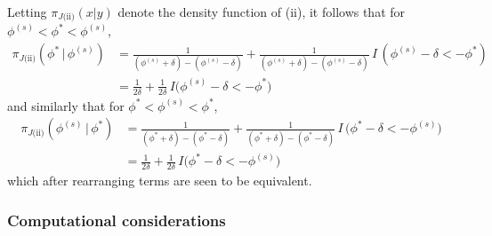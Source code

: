 \documentclass[11pt]{article}
\newcommand{\barS}{\,|\,}
\newcommand{\ind}{I}
\begin{document}
\noindent Letting $\pi_{J\text{(ii)}} \left( x | y \right)$ denote the density function of (ii), it follows that for $\phi^{(s)} < \phi^* < \phi^{(s)}$,
\begin{align*}
\pi_{J\text{(ii)}} \left( \phi^* \barS \phi^{(s)} \right) &= \frac{ 1 }{ (\phi^{(s)} + \delta) - (\phi^{(s)} - \delta) } + \frac{ 1 }{ (\phi^{(s)} + \delta) - (\phi^{(s)} - \delta) }\, \ind\,(\phi^{(s)} - \delta < -\phi^*)  \\[1ex]
&= \frac{ 1 }{ 2\delta } + \frac{ 1 }{ 2\delta }\, \ind\big(\phi^{(s)} - \delta < -\phi^{*}\big)
\end{align*}
and similarly that for $\phi^{*} < \phi^{(s)} < \phi^{*}$,
\begin{align*} \pi_{J\text{(ii)}} \left( \phi^{(s)} \barS \phi^{*} \right) &= \frac{ 1 }{ (\phi^{*} + \delta) - (\phi^{*} - \delta) } + \frac{ 1 }{ (\phi^{*} + \delta) - (\phi^{*} - \delta) }\, \ind\,(\phi^{*} - \delta < -\phi^{(s)}\big) \\[1ex]
&= \frac{ 1 }{ 2\delta } + \frac{ 1 }{ 2\delta }\, \ind\big(\phi^{*} - \delta < -\phi^{(s)}\big)
\end{align*}
which after rearranging terms are seen to be equivalent.





\subsubsection{Computational considerations}
\end{document}
